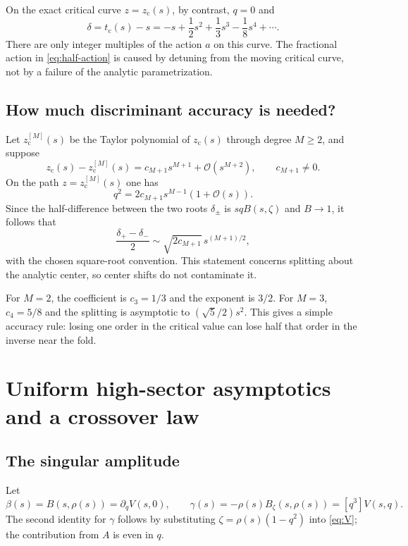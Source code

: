 \documentclass[11pt,a4paper]{article}
\theoremstyle{definition}
\theoremstyle{remark}
\newcommand{\OO}{\mathcal O}
\newcommand{\tc}{t_{\mathrm c}}
\newcommand{\zc}{z_{\mathrm c}}
\newcommand{\coeff}[2]{[#1^{#2}]}
\begin{document}
On the exact critical curve $z=\zc(s)$, by contrast, $q=0$ and
\[
 \delta=\tc(s)-s=-s+\frac12s^2+\frac13s^3-\frac18s^4+\cdots.
\]
There are only integer multiples of the action $a$ on this curve. The
fractional action in \eqref{eq:half-action} is caused by detuning from the
moving critical curve, not by a failure of the analytic parametrization.

\subsection{How much discriminant accuracy is needed?}
Let $\zc^{[M]}(s)$ be the Taylor polynomial of $\zc(s)$ through degree
$M\ge2$, and suppose
\[
 \zc(s)-\zc^{[M]}(s)=c_{M+1}s^{M+1}+\OO(s^{M+2}),
 \qquad c_{M+1}\ne0.
\]
On the path $z=\zc^{[M]}(s)$ one has
\[
 q^2=2c_{M+1}s^{M-1}(1+\OO(s)).
\]
Since the half-difference between the two roots $\delta_\pm$ is
$sqB(s,\zeta)$ and $B\to1$, it follows that
\begin{equation}\label{eq:truncated-discriminant}
 \frac{\delta_+-\delta_-}{2}
 \sim\sqrt{2c_{M+1}}\,s^{(M+1)/2},
\end{equation}
with the chosen square-root convention. This statement concerns splitting
about the analytic center, so center shifts do not contaminate it.

For $M=2$, the coefficient is $c_3=1/3$ and the exponent is $3/2$.
For $M=3$, $c_4=5/8$ and the splitting is asymptotic to
$(\sqrt5/2)s^2$. This gives a simple accuracy rule: losing one order in
the critical value can lose half that order in the inverse near the fold.

\section{Uniform high-sector asymptotics and a crossover law}
\label{sec:crossover}

\subsection{The singular amplitude}
Let
\begin{equation}\label{eq:beta-gamma}
 \beta(s)=B(s,\rho(s))=\partial_qV(s,0),\qquad
 \gamma(s)=-\rho(s)B_\zeta(s,\rho(s))=\coeff{q}{3}V(s,q).
\end{equation}
The second identity for $\gamma$ follows by substituting
$\zeta=\rho(s)(1-q^2)$ into \eqref{eq:V}; the contribution from $A$ is
even in $q$.
\end{document}
